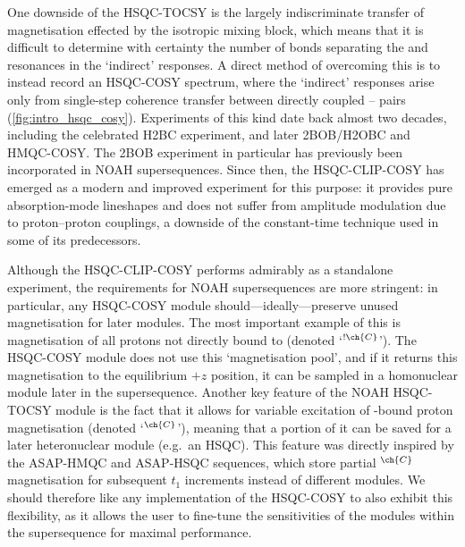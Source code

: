\documentclass[a4paper,12pt]{article}
\newcommand{\proton}{\ch{^{1}H}}
\newcommand{\carbon}{\ch{^{13}C}}
\newcommand{\HH}{\proton{}--\proton{}}
\newcommand{\magn}[1]{\ch{^1H}$^{\ch{#1}}$}
\newcommand{\magnnot}[1]{\ch{^1H}$^{!\ch{#1}}$}
\begin{document}
\begin{refsection}
One downside of the HSQC-TOCSY is the largely indiscriminate transfer of magnetisation effected by the isotropic mixing block, which means that it is difficult to determine with certainty the number of bonds separating the \carbon{} and \proton{} resonances in the `indirect' responses.
A direct method of overcoming this is to instead record an HSQC-COSY spectrum, where the `indirect' responses arise only from single-step coherence transfer between directly coupled \HH{} pairs (\cref{fig:intro_hsqc_cosy}).
Experiments of this kind date back almost two decades, including the celebrated H2BC experiment\autocite{Nyberg2005JACS,Nyberg2005MRC}, and later 2BOB/H2OBC\autocite{Kupce2017MRC} and HMQC-COSY\autocite{Hu2011JBNMR}.
The 2BOB experiment in particular has previously been incorporated in NOAH supersequences\autocite{Kupce2019JMR}.
Since then, the HSQC-CLIP-COSY\autocite{Gyongyosi2018CPC,Gyongyosi2021AC} has emerged as a modern and improved experiment for this purpose: it provides pure absorption-mode lineshapes and does not suffer from amplitude modulation due to proton--proton couplings, a downside of the constant-time technique used in some of its predecessors.

Although the HSQC-CLIP-COSY performs admirably as a standalone experiment, the requirements for NOAH supersequences are more stringent: in particular, any HSQC-COSY module should---ideally---preserve unused magnetisation for later modules.
The most important example of this is magnetisation of all protons not directly bound to \carbon{} (denoted\autocite{Orts2018M,Yong2021JMR} `\magnnot{C}').
The HSQC-COSY module does not use this `magnetisation pool', and if it returns this magnetisation to the equilibrium $+z$ position, it can be sampled in a homonuclear module later in the supersequence.
Another key feature of the NOAH HSQC-TOCSY module is the fact that it allows for variable excitation of \carbon{}-bound proton magnetisation (denoted `\magn{C}'), meaning that a portion of it can be saved for a later heteronuclear module (e.g.\ an HSQC).
This feature was directly inspired by the ASAP-HMQC\autocite{Kupce2007MRC} and ASAP-HSQC\autocite{SchulzeSunninghausen2014JACS,SchulzeSunninghausen2017JMR,Koos2019JMR,Becker2019JMR} sequences, which store partial \magn{C} magnetisation for subsequent $t_1$ increments instead of different modules.
We should therefore like any implementation of the HSQC-COSY to also exhibit this flexibility, as it allows the user to fine-tune the sensitivities of the modules within the supersequence for maximal performance.


\end{refsection}
\end{document}
